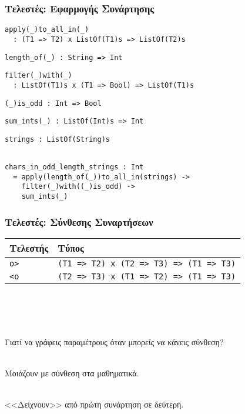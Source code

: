 \documentclass{beamer}
\def\e{\foreignlanguage{english}}
\begin{document}
\begin{frame}[fragile]

\frametitle{Τελεστές: Εφαρμογής Συνάρτησης}

\begin{otherlanguage}{english}

\begin{verbatim}
apply(_)to_all_in(_)
  : (T1 => T2) x ListOf(T1)s => ListOf(T2)s
\end{verbatim}
\begin{verbatim}
length_of(_) : String => Int
\end{verbatim}
\begin{verbatim}
filter(_)with(_)
  : ListOf(T1)s x (T1 => Bool) => ListOf(T1)s
\end{verbatim}
\begin{verbatim}
(_)is_odd : Int => Bool
\end{verbatim}
\begin{verbatim}
sum_ints(_) : ListOf(Int)s => Int
\end{verbatim}
\begin{verbatim}
strings : ListOf(String)s
\end{verbatim}
\pause
\begin{verbatim}

chars_in_odd_length_strings : Int
  = apply(length_of(_))to_all_in(strings) ->
    filter(_)with((_)is_odd) ->
    sum_ints(_)
\end{verbatim}

\end{otherlanguage}

\end{frame}

\begin{frame}

\frametitle{Τελεστές: Σύνθεσης Συναρτήσεων}

\begin{center}
\begin{tabular}{ |P{2cm}|P{8cm}| }
 \hline
 Τελεστής & Τύπος
 \\
 \hline
 \e{\texttt{o>}} & \e{\texttt{(T1 => T2) x (T2 => T3) => (T1 => T3)}}
 \\
 \e{\texttt{<o}} & \e{\texttt{(T2 => T3) x (T1 => T2) => (T1 => T3)}}
 \\
 \hline
\end{tabular}
\\~\
\\~\
\end{center}

\pause
Γιατί να γράφεις παραμέτρους όταν μπορείς να κάνεις σύνθεση?
\\~\

Μοιάζουν με σύνθεση στα μαθηματικά.
\\~\

<<Δείχνουν>> από πρώτη συνάρτηση σε δεύτερη.
\\~\
\end{frame}
\end{document}
